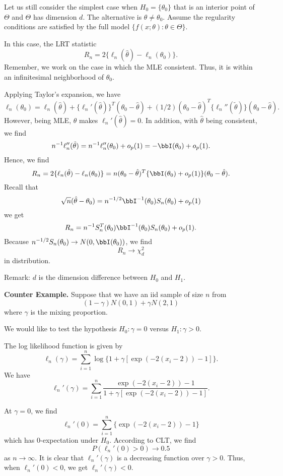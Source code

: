 Let us still consider the simplest case when $H_0 = \{ \theta_0 \}$
that  is an interior point of $\Theta$ and $\Theta$ has dimension $d$. 
The alternative is $\theta \neq \theta_0$.
Assume the regularity conditions are satisfied by the full model
$\{f(x; \theta): \theta \in \Theta\}$.


In this case, the LRT statistic
\[
R_n = 2 \{ \ell_n(\hat \theta) - \ell_n(\theta_0)\}.
\]
Remember, we work on the case in which the MLE consistent.
Thus, it is within an infinitesimal neighborhood of $\theta_0$.

Applying Taylor's expansion, we have
\[
\ell_n(\theta_0) 
=  
\ell_n(\hat \theta) +  \{\ell_n'(\hat \theta)\}^T(\theta_0 - \hat \theta)
+ (1/2)  (\theta_0 - \hat \theta)^T \{\ell_n''(\tilde \theta)\}(\theta_0 - \hat \theta).
\]
However, being MLE, $\hat \theta$ makes  $\ell_n'(\hat \theta) = 0$.
In addition, with $\hat \theta$ being consistent, we find
\[
n^{-1} \ell_n''(\tilde \theta)
=
n^{-1} \ell_n''(\theta_0) + o_p(1)
= - \bbI(\theta_0) + o_p(1).
\]
Hence, we find
\[
R_n = 2 \{ \ell_n(\hat \theta) - \ell_n(\theta_0)\}
=
n (\theta_0 - \hat \theta)^T \{\bbI(\theta_0) + o_p(1) \}(\theta_0 - \hat \theta).
\]
Recall that
\[
\sqrt{n}(\hat \theta - \theta_0) 
= n^{-1/2} \bbI^{-1} (\theta_0) S_n( \theta_0 )+ o_p(1)
\]
we get
\[
R_n
= n^{-1} S_n^T(\theta_0) \bbI^{-1}(\theta_0) S_n( \theta_0 )  + o_p(1).
\]
Because $n^{-1/2} S_n( \theta_0 ) \to N(0, \bbI(\theta_0))$,
we find
\[
R_n \to \chi_d^2
\]
in distribution.

\vs
Remark: $d$ is the dimension difference between $H_0$ and $H_1$.

\vs\vs \noindent
{\bf Counter Example.}
Suppose that we have an iid sample of size $n$ from
\[
(1-\gamma) N(0, 1) + \gamma N(2, 1)
\]
where $\gamma$ is the mixing proportion.

We would like to test the hypothesis $H_0: \gamma = 0$
versus $H_1: \gamma > 0$. 

The log likelihood function is given by
\[
\ell_n(\gamma) = \sum_{i=1}^n \log \{ 1 + \gamma [ \exp( - 2 (x_i - 2)) - 1]\}.
\]
We have
\[
\ell_n'(\gamma) = \sum_{i=1}^n 
\frac{\exp( - 2 (x_i - 2)) - 1}{1 + \gamma [ \exp( - 2 (x_i - 2)) - 1]}.
\]

At $\gamma = 0$, we find
\[
\ell_n'( 0 ) = \sum_{i=1}^n \{ \exp( - 2 (x_i - 2)) - 1\}
\]
which has 0-expectation under $H_0$.
According to CLT, we find
\[
P( \ell_n'( 0 ) > 0 ) \to 0.5
\]
as $n \to \infty$.
It is clear that $\ell_n'(\gamma)$ is a decreasing function over $\gamma > 0$.
Thus, when $ \ell_n'( 0 ) < 0$, we get $\ell_n'(\gamma)< 0$.


